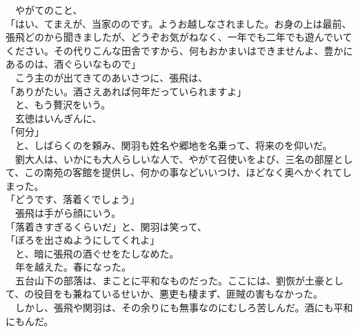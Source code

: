 \documentclass[
  paper=a5,
  fontsize=10pt,
  jafontsize=9.5pt,
  tate,                  %
  open_bracket_pos=nibu, %
]{jlreq}
\begin{document}
　やがてのこと、\\


「はい、てまえが、当家ののです。ようお越しなされました。お身の上は最前、張飛どのから聞きましたが、どうぞお気がねなく、一年でも二年でも遊んでいてください。その代りこんな田舎ですから、何もおかまいはできませんよ、豊かにあるのは、酒ぐらいなもので」\\


　こう主のが出てきてのあいさつに、張飛は、\\


「ありがたい。酒さえあれば何年だっていられますよ」\\


　と、もう贅沢をいう。\\


　玄徳はいんぎんに、\\


「何分」\\


　と、しばらくのを頼み、関羽も姓名や郷地を名乗って、将来のを仰いだ。\\


　劉大人は、いかにも大人らしいな人で、やがて召使いをよび、三名の部屋として、この南苑の客館を提供し、何かの事などいいつけ、ほどなく奥へかくれてしまった。\\


「どうです、落着くでしょう」\\


　張飛は手がら顔にいう。\\


「落着きすぎるくらいだ」と、関羽は笑って、\\


「ぼろを出さぬようにしてくれよ」\\


　と、暗に張飛の酒ぐせをたしなめた。\\


　年を越えた。春になった。\\


　五台山下の部落は、まことに平和なものだった。ここには、劉恢が土豪として、の役目をも兼ねているせいか、悪吏も棲まず、匪賊の害もなかった。\\


　しかし、張飛や関羽は、その余りにも無事なのにむしろ苦しんだ。酒にも平和にもんだ。\\
\end{document}
